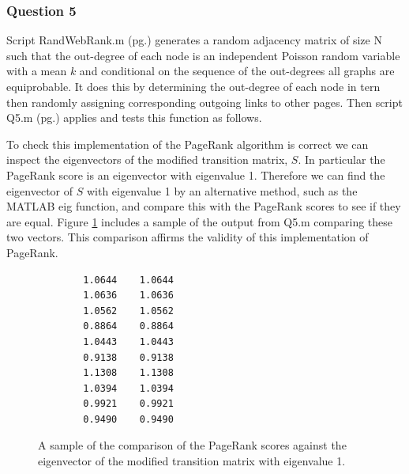 \documentclass[a4paper]{article}
\begin{document}
\subsubsection*{Question 5}
Script RandWebRank.m (pg.\pageref{PQ5rand}) generates a random adjacency matrix of size N such that the out-degree of each node is an independent Poisson random variable with a mean $k$ and conditional on the sequence of the out-degrees all graphs are equiprobable. It does this by determining the out-degree of each node in tern then randomly assigning corresponding outgoing links to other pages. Then script Q5.m (pg.\pageref{PQ5}) applies and tests this function as follows.

\bigskip
To check this implementation of the PageRank algorithm is correct we can inspect the eigenvectors of the modified transition matrix, $S$. In particular the PageRank score is an eigenvector with eigenvalue 1. Therefore we can find the eigenvector of $S$ with eigenvalue 1 by an alternative method, such as the MATLAB eig function, and compare this with the PageRank scores to see if they are equal. Figure \ref{fig:q5a} includes a sample of the output from Q5.m comparing these two vectors. This comparison affirms the validity of this implementation of PageRank.
\begin{figure}[H]
    \centering
    \begin{verbatim}
        1.0644    1.0644
        1.0636    1.0636
        1.0562    1.0562
        0.8864    0.8864
        1.0443    1.0443
        0.9138    0.9138
        1.1308    1.1308
        1.0394    1.0394
        0.9921    0.9921
        0.9490    0.9490
    \end{verbatim}
    \caption{A sample of the comparison of the PageRank scores against the eigenvector of the modified transition matrix with eigenvalue 1.}
    \label{fig:q5a}
\end{figure}
\end{document}
